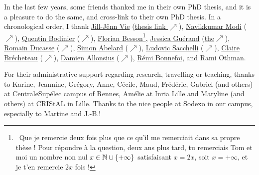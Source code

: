 \begin{acknowledgements}
In the last few years, some friends thanked me in their own PhD thesis, and it is a pleasure to do the same, and cross-link to their own PhD thesis.
In a chronological order, I thank
\href{http://jill-jenn.net/}{Jill-Jênn Vie} (\href{https://github.com/jilljenn/phd}{thesis link $\nearrow$}), \href{https://navikkumarmodi.wordpress.com/}{Navikkumar Modi} (\href{https://tel.archives-ouvertes.fr/tel-01668536/document}{$\nearrow$}), \href{https://quentinbodinier.wordpress.com/}{Quentin Bodinier} (\href{https://tel.archives-ouvertes.fr/tel-01731022/document}{$\nearrow$}), \href{https://paris-sorbonne.academia.edu/FBesson}{Florian Besson}\footnote{~Que je remercie deux fois plus que ce qu'il me remerciait dans sa propre thèse ! Pour répondre à la question, deux ans plus tard, tu remerciais Tom et moi un nombre non nul $x\in\mathbb{N}\cup\{+\infty\}$ satisfaisant $x=2x$, soit $x=+\infty$, et je t'en remercie $2x$ fois !}, \href{https://sites.google.com/view/guerand}{Jessica Guérand} (\href{https://www.theses.fr/s175725}{the}\href{https://www.theses.fr/s175725}{$\nearrow$}), \href{https://sites.google.com/view/ducasse/}{Romain Ducasse} (\href{https://drive.google.com/open?id=1u2oxRRimcO0jQfuYwSVwgKfcHU5DdoPK}{$\nearrow$}), \href{https://members.loria.fr/SAbelard/}{Simon Abelard} (\href{https://members.loria.fr/SAbelard/theseabelard.pdf}{$\nearrow$}), \href{http://www.cmap.polytechnique.fr/~sacchelli/}{Ludovic Sacchelli} (\href{https://tel.archives-ouvertes.fr/tel-01893068/document}{$\nearrow$}), \href{http://pages.saclay.inria.fr/claire.brecheteau/}{Claire Brécheteau} (\href{https://hal.archives-ouvertes.fr/tel-01897787/document}{$\nearrow$}), \href{http://www.i2m.univ-amu.fr/perso/damien.allonsius/}{Damien Allonsius} (\href{http://www.i2m.univ-amu.fr/perso/damien.allonsius/documents/recherche/these/Main.pdf}{$\nearrow$}), \href{https://remibonnefoi.wordpress.com/}{Rémi Bonnefoi}, and Rami Othman.


For their administrative support regarding research, travelling or teaching,
thanks to Karine, Jeannine, Grégory, Anne, Cécile, Maud, Frédéric, Gabriel (and others) at CentraleSupélec campus of Rennes, Amélie at Inria Lille and Maryline (and others) at CRIStAL in Lille.
Thanks to the nice people at Sodexo in our campus, especially to Martine and J.-B.!


\end{acknowledgements}
